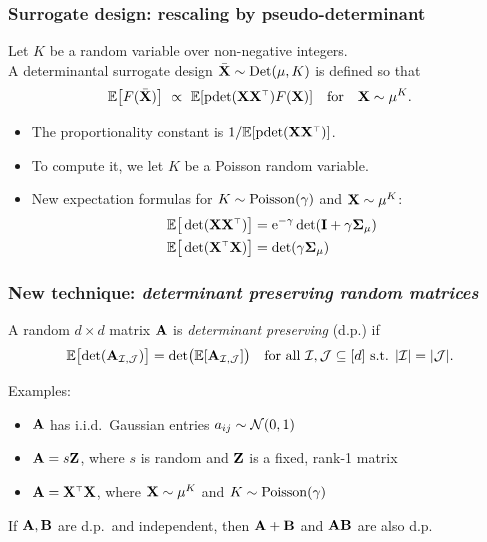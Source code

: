 \documentclass{beamer}
\begin{document}
\begin{frame}
  \frametitle{Surrogate design: rescaling by pseudo-determinant}
  \begin{definition}
    Let $K$ be a random variable over non-negative integers. \\
    A determinantal surrogate design
    ${\bar{\mathbf X}}\sim {\mathrm{Det}}(\mu,K)$ is defined so that
\begin{align*}
  \E\big[F(\Xb)\big]\  \propto\ \E[\pdet(\X\X^\top)F(\X)]
  \quad\text{for}\quad\X\sim\mu^K.
\end{align*}
\end{definition}
\begin{itemize}
  \pause
\item The proportionality constant is $1/\E[\pdet(\X\X^\top)]$.
\pause
\item To compute it, we let $K$ be a Poisson random variable.
\pause
\item New expectation formulas for $K\sim{\operatorname{Poisson}}(\gamma)$ and $\mathbf X\sim\mu^K$:
\begin{align*}
  \E\big[\det(\X\X^\top)\big]
  &= \ee^{-\gamma}\det(\I+\gamma\Sigmab_\mu)\\
  \E\big[\det(\X^\top\X)\big]
  &= \det(\gamma\Sigmab_\mu)
\end{align*}
\end{itemize}

\end{frame}

\begin{frame}
  \frametitle{New technique: \textit{determinant preserving random
      matrices}}
\begin{definition}
A random $d\times d$ matrix $\mathbf A$ is \emph{determinant
  preserving} (d.p.) if
\begin{align*}
  \mathbb E\big[\!\det(\mathbf A_{\mathcal I,\mathcal{J}})\big] =
  \det\!\big(\mathbb E[\mathbf A_{\mathcal I,\mathcal{J}}]\big)\quad \text{for all }\mathcal I,\mathcal{J}\subseteq
  [d]\text{ s.t. }|\mathcal I|=|\mathcal{J}|.
\end{align*}
\vspace{-7mm}
\end{definition}
\pause
Examples:
  \begin{itemize}
  \item $\mathbf A$ has i.i.d.~Gaussian entries  $a_{ij}\sim\mathcal{N}(0,1)$\pause    
  \item $\mathbf A = s\mathbf Z$, where $s$ is random and $\mathbf Z$ is a fixed,
    rank-1 matrix\pause
    \item $\A=\X^\top\X$, where $\mathbf X\sim\mu^K$ and $K\sim{\operatorname{Poisson}}(\gamma)$
    \end{itemize}
    \pause
  \begin{theorem}
    If $\mathbf A,\mathbf B$ are d.p.~and independent, then $\mathbf A+\mathbf B$ and $\mathbf A\mathbf B$ are
    also d.p.
  \end{theorem}
\end{frame}
\end{document}

